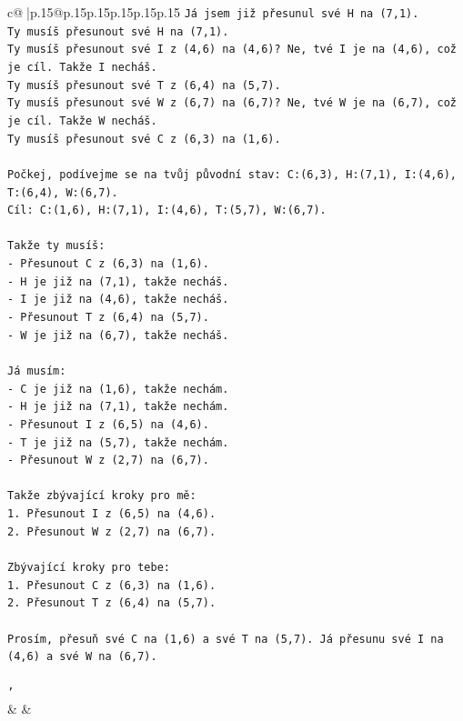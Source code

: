\documentclass{article}
\begin{document}
{\begin{supertabular}{c@{$\;$}|p{.15\linewidth}@{}p{.15\linewidth}p{.15\linewidth}p{.15\linewidth}p{.15\linewidth}p{.15\linewidth}}
{{{\texttt{Já jsem již přesunul své H na (7,1).} \\
\texttt{Ty musíš přesunout své H na (7,1).} \\
\texttt{Ty musíš přesunout své I z (4,6) na (4,6)? Ne, tvé I je na (4,6), což je cíl. Takže I necháš.} \\
\texttt{Ty musíš přesunout své T z (6,4) na (5,7).} \\
\texttt{Ty musíš přesunout své W z (6,7) na (6,7)? Ne, tvé W je na (6,7), což je cíl. Takže W necháš.} \\
\texttt{Ty musíš přesunout své C z (6,3) na (1,6).} \\
\\ 
\texttt{Počkej, podívejme se na tvůj původní stav: C:(6,3), H:(7,1), I:(4,6), T:(6,4), W:(6,7).} \\
\texttt{Cíl: C:(1,6), H:(7,1), I:(4,6), T:(5,7), W:(6,7).} \\
\\ 
\texttt{Takže ty musíš:} \\
\texttt{{-} Přesunout C z (6,3) na (1,6).} \\
\texttt{{-} H je již na (7,1), takže necháš.} \\
\texttt{{-} I je již na (4,6), takže necháš.} \\
\texttt{{-} Přesunout T z (6,4) na (5,7).} \\
\texttt{{-} W je již na (6,7), takže necháš.} \\
\\ 
\texttt{Já musím:} \\
\texttt{{-} C je již na (1,6), takže nechám.} \\
\texttt{{-} H je již na (7,1), takže nechám.} \\
\texttt{{-} Přesunout I z (6,5) na (4,6).} \\
\texttt{{-} T je již na (5,7), takže nechám.} \\
\texttt{{-} Přesunout W z (2,7) na (6,7).} \\
\\ 
\texttt{Takže zbývající kroky pro mě:} \\
\texttt{1. Přesunout I z (6,5) na (4,6).} \\
\texttt{2. Přesunout W z (2,7) na (6,7).} \\
\\ 
\texttt{Zbývající kroky pro tebe:} \\
\texttt{1. Přesunout C z (6,3) na (1,6).} \\
\texttt{2. Přesunout T z (6,4) na (5,7).} \\
\\ 
\texttt{Prosím, přesuň své C na (1,6) a své T na (5,7). Já přesunu své I na (4,6) a své W na (6,7).} \\
\\ 
\texttt{'} \\
            }
        }
    }
    & & \\ \\


\end{supertabular}}
\end{document}
